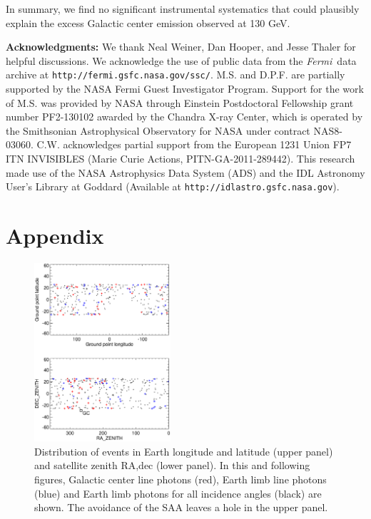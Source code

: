 \documentclass[aps,twocolumn,prd,superscriptaddress,showpacs,nofootinbib,fixfloat]{revtex4}
\newcommand{\Fermi}{{\slshape Fermi}}
\begin{document}
In summary, we find no significant instrumental systematics that could
plausibly explain the excess Galactic center emission observed at 130 GeV. 

\vskip 0.15in {\bf \noindent Acknowledgments:} We thank Neal
Weiner, Dan Hooper, and Jesse Thaler for helpful discussions. We acknowledge the use of
public data from the \Fermi\ data archive at
\texttt{http://fermi.gsfc.nasa.gov/ssc/}.  M.S. and
D.P.F. are partially supported by the NASA Fermi Guest
Investigator Program. Support for the work of M.S. was
provided by NASA through Einstein Postdoctoral Fellowship
grant number PF2-130102 awarded by the Chandra X-ray Center,
which is operated by the Smithsonian Astrophysical
Observatory for NASA under contract
NAS8-03060. C.W. acknowledges partial support from the
European 1231 Union FP7 ITN INVISIBLES (Marie Curie Actions,
PITN-GA-2011-289442).  This research made use of the NASA
Astrophysics Data System (ADS) and the IDL Astronomy User's
Library at Goddard (Available at
\texttt{http://idlastro.gsfc.nasa.gov}).

\section{Appendix}

\begin{figure}
  \centering
  \includegraphics[width=0.45\textwidth]{plots/geo-lonlat.ps}
  \caption{Distribution of events in Earth
  longitude and latitude (upper panel) and satellite zenith
  RA,dec (lower panel).  In this and following figures, Galactic center line photons (red), Earth limb line
  photons (blue) and Earth limb photons for all incidence angles (black) are
  shown.  The avoidance of the SAA leaves a
  hole in the upper panel.}
  \label{fig:geo-lonlat}
\end{figure}
\end{document}
